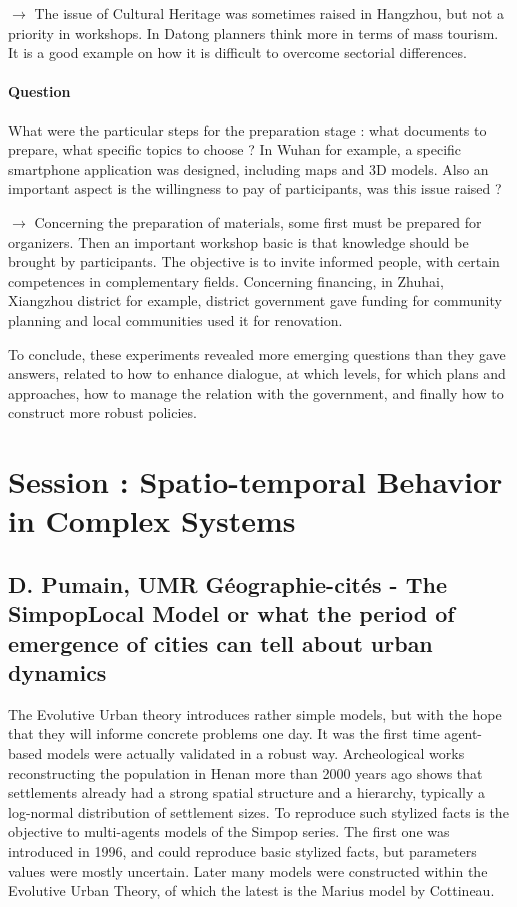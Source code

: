 \documentclass[10pt]{article}
\begin{document}
$\rightarrow$ The issue of Cultural Heritage was sometimes raised in Hangzhou, but not  a priority in workshops. In Datong planners think more in terms of mass tourism. It is a good example on how it is difficult to overcome sectorial differences.


\paragraph{Question}


What were the particular steps for the preparation stage : what documents to prepare, what specific topics to choose ? In Wuhan for example, a specific smartphone application was designed, including maps and 3D models. Also an important aspect is the willingness to pay of participants, was this issue raised ?

$\rightarrow$ Concerning the preparation of materials, some first must be prepared for organizers. Then an important workshop basic is that knowledge should be brought by participants. The objective is to invite informed people, with certain competences in complementary fields. Concerning financing, in Zhuhai, Xiangzhou district for example, district government gave funding for community planning and local communities used it for renovation.

\bigskip


To conclude, these experiments revealed more emerging questions than they gave answers, related to how to enhance dialogue, at which levels, for which plans and approaches, how to manage the relation with the government, and finally how to construct more robust policies.





\section*{Session : Spatio-temporal Behavior in Complex Systems}

\subsection*{D. Pumain, UMR G{\'e}ographie-cit{\'e}s - The SimpopLocal Model or what the period of emergence of cities can tell about urban dynamics}


The Evolutive Urban theory introduces rather simple models, but with the hope that they will informe concrete problems one day. It was the first time agent-based models were actually validated in a robust way. Archeological works reconstructing the population in Henan more than 2000 years ago shows that settlements already had a strong spatial structure and a hierarchy, typically a log-normal distribution of settlement sizes. To reproduce such stylized facts is the objective to multi-agents models of the Simpop series. The first one was introduced in 1996, and could reproduce basic stylized facts, but parameters values were mostly uncertain. Later many models were constructed within the Evolutive Urban Theory, of which the latest is the Marius model by Cottineau.
\end{document}
